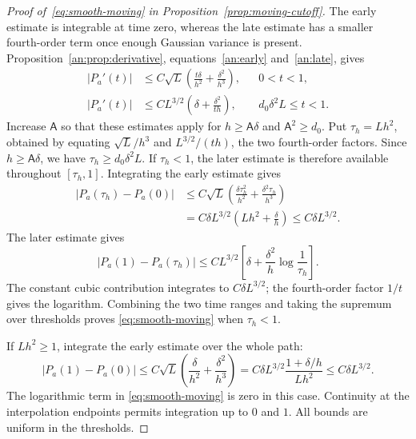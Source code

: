 \documentclass[11pt,letterpaper]{article}
\newcommand{\Ac}{\mathsf A}
\theoremstyle{remark}
\begin{document}
\begin{proof}[Proof of~\eqref{eq:smooth-moving} in
Proposition~\ref{prop:moving-cutoff}]
The early estimate is integrable at time zero, whereas the late estimate
has a smaller fourth-order term once enough Gaussian variance is present.
Proposition~\ref{an:prop:derivative}, equations~\eqref{an:early}
and~\eqref{an:late}, gives
\[
 \begin{aligned}
 |P_a'(t)|&\le C\sqrt L\left(\frac{t\delta}{h^2}
                    +\frac{\delta^2}{h^3}\right),&&0<t<1,\\
 |P_a'(t)|&\le CL^{3/2}\left(\delta+\frac{\delta^2}{th}\right),
                    &&d_0\delta^2L\le t<1.
 \end{aligned}
\]
Increase \(\Ac\) so that these estimates apply for \(h\ge\Ac\delta\)
and \(\Ac^2\ge d_0\). Put \(\tau_h=Lh^2\), obtained by equating
\(\sqrt L/h^3\) and \(L^{3/2}/(th)\), the two fourth-order factors. Since \(h\ge\Ac\delta\), we have
\(\tau_h\ge d_0\delta^2L\). If \(\tau_h<1\), the later estimate
is therefore available throughout \([\tau_h,1]\). Integrating the
early estimate gives
\begin{align*}
 |P_a(\tau_h)-P_a(0)|
 &\le C\sqrt L\left(
 \frac{\delta\tau_h^2}{h^2}
 +\frac{\delta^2\tau_h}{h^3}\right)\\
 &=C\delta L^{3/2}
 \left(Lh^2+\frac\delta h\right)
 \le C\delta L^{3/2}.
\end{align*}
The later estimate gives
\[
 |P_a(1)-P_a(\tau_h)|
 \le CL^{3/2}\left[
 \delta+\frac{\delta^2}{h}\log\frac1{\tau_h}\right].
\]
The constant cubic contribution integrates to \(C\delta L^{3/2}\);
the fourth-order factor \(1/t\) gives the logarithm. Combining
the two time ranges and taking the supremum over thresholds proves
\eqref{eq:smooth-moving} when \(\tau_h<1\).

If \(Lh^2\ge1\), integrate the early estimate over the whole path:
\[
 |P_a(1)-P_a(0)|
 \le C\sqrt L\left(\frac\delta{h^2}
 +\frac{\delta^2}{h^3}\right)
 =C\delta L^{3/2}\frac{1+\delta/h}{Lh^2}
 \le C\delta L^{3/2}.
\]
The logarithmic term in \eqref{eq:smooth-moving} is zero in this case.
Continuity at the interpolation endpoints permits integration up to
\(0\) and \(1\). All bounds are uniform in the thresholds.
\end{proof}
\end{document}
